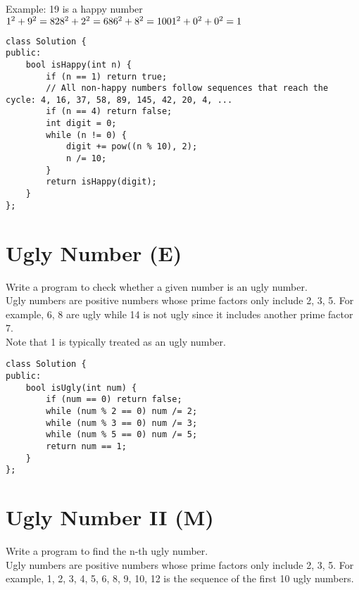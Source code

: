 Example: 19 is a happy number\\

    $1^2 + 9^2 = 82\\
    8^2 + 2^2 = 68\\
    6^2 + 8^2 = 100\\
    1^2 + 0^2 + 0^2 = 1$\\
    
\begin{lstlisting}
class Solution {
public:
    bool isHappy(int n) {
        if (n == 1) return true;
        // All non-happy numbers follow sequences that reach the cycle: 4, 16, 37, 58, 89, 145, 42, 20, 4, ... 
        if (n == 4) return false;
        int digit = 0;
        while (n != 0) {
            digit += pow((n % 10), 2);
            n /= 10;
        }
        return isHappy(digit);
    }
};
\end{lstlisting}


\section{Ugly Number (E)}
Write a program to check whether a given number is an ugly number.\\

Ugly numbers are positive numbers whose prime factors only include 2, 3, 5. For example, 6, 8 are ugly while 14 is not ugly since it includes another prime factor 7.\\

Note that 1 is typically treated as an ugly number. \\

\begin{lstlisting}
class Solution {
public:
    bool isUgly(int num) {
        if (num == 0) return false;
        while (num % 2 == 0) num /= 2;
        while (num % 3 == 0) num /= 3;
        while (num % 5 == 0) num /= 5;
        return num == 1;
    }
};
\end{lstlisting}


\section{Ugly Number II (M)}
Write a program to find the n-th ugly number. \\

Ugly numbers are positive numbers whose prime factors only include 2, 3, 5. For example, 1, 2, 3, 4, 5, 6, 8, 9, 10, 12 is the sequence of the first 10 ugly numbers. \\

